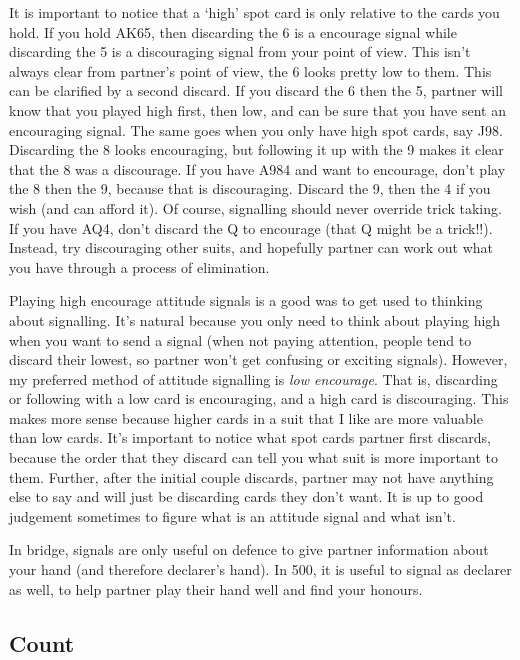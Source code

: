\documentclass[a4paper]{report}
\theoremstyle{question}
\theoremstyle{theorem}
\theoremstyle{definition}
\newcommand{\<}{\left\langle}%
\renewcommand{\>}{\right\rangle}%
\begin{document}
It is important to notice that a `high' spot card is only relative to the cards you hold. If you hold AK65, then discarding the 6 is a encourage signal while discarding the 5 is a discouraging signal from your point of view. This isn't always clear from partner's point of view, the 6 looks pretty low to them. This can be clarified by a second discard. If you discard the 6 then the 5, partner will know that you played high first, then low, and can be sure that you have sent an encouraging signal. The same goes when you only have high spot cards, say J98. Discarding the 8 looks encouraging, but following it up with the 9 makes it clear that the 8 was a discourage. If you have A984 and want to encourage, don't play the 8 then the 9, because that is discouraging. Discard the 9, then the 4 if you wish (and can afford it). Of course, signalling should never override trick taking. If you have AQ4, don't discard the Q to encourage (that Q might be a trick!!). Instead, try discouraging other suits, and hopefully partner can work out what you have through a process of elimination.

Playing high encourage attitude signals is a good was to get used to thinking about signalling. It's natural because you only need to think about playing high when you want to send a signal (when not paying attention, people tend to discard their lowest, so partner won't get confusing or exciting signals). However, my preferred method of attitude signalling is \textit{low encourage}. That is, discarding or following with a low card is encouraging, and a high card is discouraging. This makes more sense because higher cards in a suit that I like are more valuable than low cards. It's important to notice what spot cards partner first discards, because the order that they discard can tell you what suit is more important to them. Further, after the initial couple discards, partner may not have anything else to say and will just be discarding cards they don't want. It is up to good judgement sometimes to figure what is an attitude signal and what isn't.

In bridge, signals are only useful on defence to give partner information about your hand (and therefore declarer's hand). In 500, it is useful to signal as declarer as well, to help partner play their hand well and find your honours.

\subsection*{Count}
\end{document}
